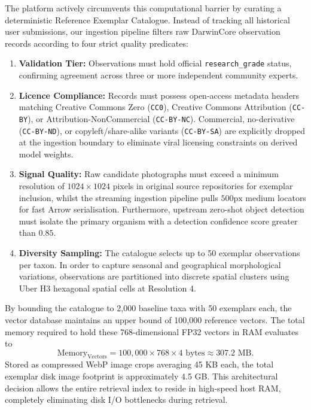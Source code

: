 The platform actively circumvents this computational barrier by curating a deterministic Reference Exemplar Catalogue. Instead of tracking all historical user submissions, our ingestion pipeline filters raw DarwinCore observation records according to four strict quality predicates:
\begin{enumerate}
    \item \textbf{Validation Tier:} Observations must hold official \texttt{research\_grade} status, confirming agreement across three or more independent community experts.
    \item \textbf{Licence Compliance:} Records must possess open-access metadata headers matching Creative Commons Zero (\texttt{CC0}), Creative Commons Attribution (\texttt{CC-BY}), or Attribution-NonCommercial (\texttt{CC-BY-NC}). Commercial, no-derivative (\texttt{CC-BY-ND}), or copyleft/share-alike variants (\texttt{CC-BY-SA}) are explicitly dropped at the ingestion boundary to eliminate viral licensing constraints on derived model weights.
    \item \textbf{Signal Quality:} Raw candidate photographs must exceed a minimum resolution of $1024 \times 1024$ pixels in original source repositories for exemplar inclusion, whilst the streaming ingestion pipeline pulls $500\text{px}$ medium locators for fast Arrow serialisation. Furthermore, upstream zero-shot object detection must isolate the primary organism with a detection confidence score greater than $0.85$.
    \item \textbf{Diversity Sampling:} The catalogue selects up to 50 exemplar observations per taxon. In order to capture seasonal and geographical morphological variations, observations are partitioned into discrete spatial clusters using Uber H3 hexagonal spatial cells at Resolution 4.
\end{enumerate}

By bounding the catalogue to 2,000 baseline taxa with 50 exemplars each, the vector database maintains an upper bound of 100,000 reference vectors. The total memory required to hold these 768-dimensional FP32 vectors in RAM evaluates to
\[
\text{Memory}_{\text{Vectors}} = 100{,}000 \times 768 \times 4 \text{ bytes} \approx 307.2 \text{ MB}.
\]
Stored as compressed WebP image crops averaging 45 KB each, the total exemplar disk image footprint is approximately 4.5 GB. This architectural decision allows the entire retrieval index to reside in high-speed host RAM, completely eliminating disk I/O bottlenecks during retrieval.

